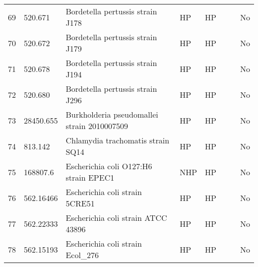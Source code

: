 \begin{tabular}{llllllll}
69  &     520.671 &                                  Bordetella pertussis strain J178 &            HP &              HP &                                       \cite{bowden2016genome} &                                  &            No \\
70  &     520.672 &                                  Bordetella pertussis strain J179 &            HP &              HP &                                       \cite{bowden2016genome} &                                  &            No \\
71  &     520.678 &                                  Bordetella pertussis strain J194 &            HP &              HP &                                       \cite{bowden2016genome} &                                  &            No \\
72  &     520.680 &                                  Bordetella pertussis strain J296 &            HP &              HP &                                       \cite{bowden2016genome} &                                  &            No \\
73  &   28450.655 &                       Burkholderia pseudomallei strain 2010007509 &            HP &              HP &                                              \cite{28450.655} &       \cite{mangalea2017nitrate} &            No \\
74  &     813.142 &                                 Chlamydia trachomatis strain SQ14 &            HP &              HP &                              \cite{suchland2017demonstration} &                                  &            No \\
75  &    168807.6 &                             Escherichia coli O127:H6 strain EPEC1 &           NHP &              HP &                                         \cite{trabulsi200210} &                                  &            No \\
76  &   562.16466 &                                    Escherichia coli strain 5CRE51 &            HP &              HP &                                              \cite{562.16466} &                                  &            No \\
77  &   562.22333 &                                Escherichia coli strain ATCC 43896 &            HP &              HP &                                              \cite{562.22333} &                                  &            No \\
78  &   562.15193 &                                 Escherichia coli strain Ecol\_276 &            HP &              HP &                                              \cite{562.15193} &                                  &            No \\

\end{tabular}
